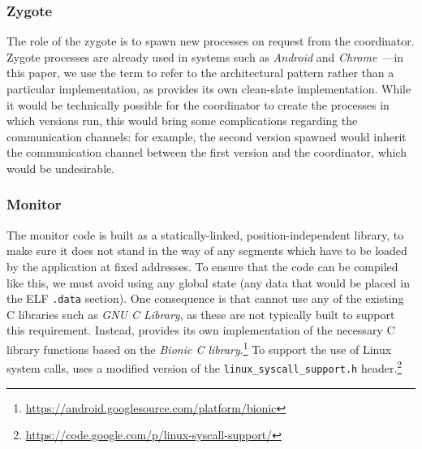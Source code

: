 \subsubsection{Zygote}

The role of the zygote is to spawn new processes on request from the
coordinator.  Zygote processes are already used in systems such as
\textit{Android} and \textit{Chrome}~\cite{linuxzygote}---in this paper, we use
the term to refer to the architectural pattern rather than a particular
implementation, as \varan provides its own clean-slate implementation.  While
it would be technically possible for the coordinator to create the processes in
which versions run, this would bring some complications regarding the
communication channels: for example, the second version spawned would inherit
the communication channel between the first version and the coordinator, which
would be undesirable.

\subsubsection{Monitor}

The monitor code is built as a statically-linked, position-independent library,
to make sure it does not stand in the way of any segments which have to be
loaded by the application at fixed addresses.  To ensure that the code can be
compiled like this, we must avoid using any global state (\ie any data that
would be placed in the ELF \lstinline`.data` section). One consequence is that
\varan cannot use any of the existing C libraries such as \textit{GNU C
Library}, as these are not typically built to support this requirement.
Instead, \varan provides its own implementation of the necessary C library
functions based on the \textit{Bionic C
library}.\footnote{\url{https://android.googlesource.com/platform/bionic}} To
support the use of Linux system calls, \varan uses a modified version of the
\lstinline`linux_syscall_support.h`
header.\footnote{\url{https://code.google.com/p/linux-syscall-support/}}




